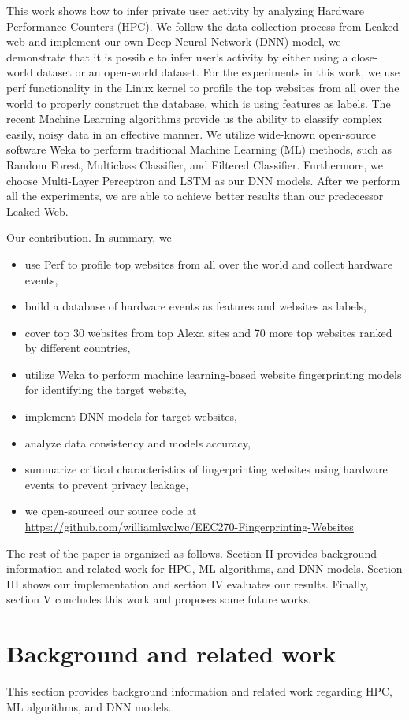 \documentclass[conference]{IEEEtran}
\begin{document}
This work shows how to infer private user activity by analyzing Hardware Performance Counters (HPC). We follow the data collection process from Leaked-web \cite{b1} and implement our own Deep Neural Network (DNN) model, we demonstrate that it is possible to infer user’s activity by either using a close-world dataset or an open-world dataset. For the experiments in this work, we use perf functionality in the Linux kernel to profile the top websites from all over the world to properly construct the database, which is using features as labels. The recent Machine Learning algorithms provide us the ability to classify complex easily, noisy data in an effective manner. We utilize wide-known open-source software Weka\cite{b18} to perform traditional Machine Learning (ML) methods, such as Random Forest, Multiclass Classifier, and Filtered Classifier. Furthermore, we choose Multi-Layer Perceptron and LSTM as our DNN models. After we perform all the experiments, we are able to achieve better results than our predecessor Leaked-Web.

Our contribution. In summary, we
\begin{itemize}
    \item use Perf to profile top websites from all over the world and collect hardware events,
    \item build a database of hardware events as features and websites as labels,
    \item cover top 30 websites from top Alexa sites and 70 more top websites ranked by different countries,
    \item utilize Weka to perform machine learning-based website fingerprinting models for identifying the target website,
    \item implement DNN models for target websites,
    \item analyze data consistency and models accuracy,
    \item summarize critical characteristics of fingerprinting websites using hardware events to prevent privacy leakage,
    \item we open-sourced our source code at \url{https://github.com/williamlwclwc/EEC270-Fingerprinting-Websites}
\end{itemize}
The rest of the paper is organized as follows. Section II provides background information and related work for HPC, ML algorithms, and DNN models. Section III shows our implementation and section IV evaluates our results. Finally, section V concludes this work and proposes some future works.
\section{Background and related work} 
This section provides background information and related work regarding HPC, ML algorithms, and DNN models.
\end{document}
